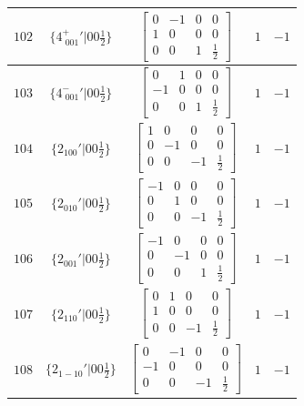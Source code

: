 \documentclass[fleqn,8pt]{jsarticle}
\begin{document}
\begin{longtable}{ccccc}
$ 102 $ & $ \{4^{+}_{\,\,001}{}'|0 0 \frac{1}{2}\} $ & $ \begin{bmatrix} 0 & -1 & 0 & 0 \\ 1 & 0 & 0 & 0 \\ 0 & 0 & 1 & \frac{1}{2} \end{bmatrix} $ & $ 1 $ & $ -1 $ \\ \hline
$ 103 $ & $ \{4^{-}_{\,\,001}{}'|0 0 \frac{1}{2}\} $ & $ \begin{bmatrix} 0 & 1 & 0 & 0 \\ -1 & 0 & 0 & 0 \\ 0 & 0 & 1 & \frac{1}{2} \end{bmatrix} $ & $ 1 $ & $ -1 $ \\ \hline
$ 104 $ & $ \{2{}_{100}{}'|0 0 \frac{1}{2}\} $ & $ \begin{bmatrix} 1 & 0 & 0 & 0 \\ 0 & -1 & 0 & 0 \\ 0 & 0 & -1 & \frac{1}{2} \end{bmatrix} $ & $ 1 $ & $ -1 $ \\ \hline
$ 105 $ & $ \{2{}_{010}{}'|0 0 \frac{1}{2}\} $ & $ \begin{bmatrix} -1 & 0 & 0 & 0 \\ 0 & 1 & 0 & 0 \\ 0 & 0 & -1 & \frac{1}{2} \end{bmatrix} $ & $ 1 $ & $ -1 $ \\ \hline
$ 106 $ & $ \{2{}_{001}{}'|0 0 \frac{1}{2}\} $ & $ \begin{bmatrix} -1 & 0 & 0 & 0 \\ 0 & -1 & 0 & 0 \\ 0 & 0 & 1 & \frac{1}{2} \end{bmatrix} $ & $ 1 $ & $ -1 $ \\ \hline
$ 107 $ & $ \{2{}_{110}{}'|0 0 \frac{1}{2}\} $ & $ \begin{bmatrix} 0 & 1 & 0 & 0 \\ 1 & 0 & 0 & 0 \\ 0 & 0 & -1 & \frac{1}{2} \end{bmatrix} $ & $ 1 $ & $ -1 $ \\ \hline
$ 108 $ & $ \{2{}_{1-10}{}'|0 0 \frac{1}{2}\} $ & $ \begin{bmatrix} 0 & -1 & 0 & 0 \\ -1 & 0 & 0 & 0 \\ 0 & 0 & -1 & \frac{1}{2} \end{bmatrix} $ & $ 1 $ & $ -1 $ \\ \hline

\end{longtable}
\end{document}
